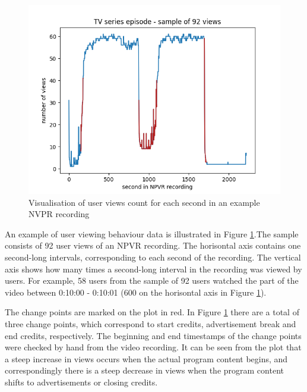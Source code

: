 \begin{figure}[H]
    \centering
    \includegraphics[width=1\textwidth]{../plots/episode.png}
    \caption{Visualisation of user views count for each second in an example NVPR recording}
    \label{fig:intro_ads_outro}
    \end{figure}

An example of user viewing behaviour data is illustrated in Figure \ref{fig:intro_ads_outro}.The sample consists of 92 user views of an NPVR recording. The horisontal axis contains one second-long intervals, corresponding to each second of the recording. The vertical axis shows how many times a second-long interval in the recording was viewed by users. For example, 58 users from the sample of 92 users watched the part of the video between 0:10:00 - 0:10:01 (600 on the horisontal axis in Figure \ref{fig:intro_ads_outro}).

The change points are marked on the plot in red. In Figure \ref{fig:intro_ads_outro} there are a total of three change points, which correspond to start credits, advertisement break and end credits, respectively. The beginning and end timestamps of the change points were checked by hand from the video recording. It can be seen from the plot that a steep increase in views occurs when the actual program content begins, and correspondingly there is a steep decrease in views when the program content shifts to advertisements or closing credits.


